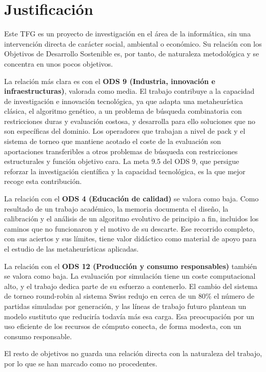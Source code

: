
\section*{Justificación}

Este TFG es un proyecto de investigación en el área de la informática, sin una intervención directa de carácter social, ambiental o económico. Su relación con los Objetivos de Desarrollo Sostenible es, por tanto, de naturaleza metodológica y se concentra en unos pocos objetivos.

La relación más clara es con el \textbf{ODS 9 (Industria, innovación e infraestructuras)}, valorada como media. El trabajo contribuye a la capacidad de investigación e innovación tecnológica, ya que adapta una metaheurística clásica, el algoritmo genético, a un problema de búsqueda combinatoria con restricciones duras y evaluación costosa, y desarrolla para ello soluciones que no son específicas del dominio. Los operadores que trabajan a nivel de pack y el sistema de torneo que mantiene acotado el coste de la evaluación son aportaciones transferibles a otros problemas de búsqueda con restricciones estructurales y función objetivo cara. La meta 9.5 del ODS 9, que persigue reforzar la investigación científica y la capacidad tecnológica, es la que mejor recoge esta contribución.

La relación con el \textbf{ODS 4 (Educación de calidad)} se valora como baja. Como resultado de un trabajo académico, la memoria documenta el diseño, la calibración y el análisis de un algoritmo evolutivo de principio a fin, incluidos los caminos que no funcionaron y el motivo de su descarte. Ese recorrido completo, con sus aciertos y sus límites, tiene valor didáctico como material de apoyo para el estudio de las metaheurísticas aplicadas.

La relación con el \textbf{ODS 12 (Producción y consumo responsables)} también se valora como baja. La evaluación por simulación tiene un coste computacional alto, y el trabajo dedica parte de su esfuerzo a contenerlo. El cambio del sistema de torneo round-robin al sistema Swiss redujo en cerca de un 80\% el número de partidas simuladas por generación, y las líneas de trabajo futuro plantean un modelo sustituto que reduciría todavía más esa carga. Esa preocupación por un uso eficiente de los recursos de cómputo conecta, de forma modesta, con un consumo responsable.

El resto de objetivos no guarda una relación directa con la naturaleza del trabajo, por lo que se han marcado como no procedentes.

